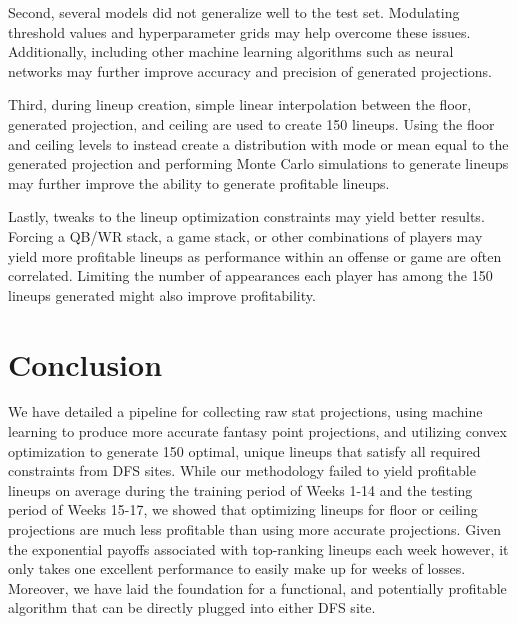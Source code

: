 \documentclass[12pt]{article}
\begin{document}
Second, several models did not generalize well to the test set. Modulating threshold values and hyperparameter grids may help overcome these issues. Additionally, including other machine learning algorithms such as neural networks may further improve accuracy and precision of generated projections.\bigskip

Third, during lineup creation, simple linear interpolation between the floor, generated projection, and ceiling are used to create 150 lineups. Using the floor and ceiling levels to instead create a distribution with mode or mean equal to the generated projection and performing Monte Carlo simulations to generate lineups may further improve the ability to generate profitable lineups. \bigskip

Lastly, tweaks to the lineup optimization constraints may yield better results. Forcing a QB/WR stack, a game stack, or other combinations of players may yield more profitable lineups as performance within an offense or game are often correlated. Limiting the number of appearances each player has among the 150 lineups generated might also improve profitability.

\section{Conclusion}
We have detailed a pipeline for collecting raw stat projections, using machine learning to produce more accurate fantasy point projections, and utilizing convex optimization to generate 150 optimal, unique lineups that satisfy all required constraints from DFS sites. While our methodology failed to yield profitable lineups on average during the training period of Weeks 1-14 and the testing period of Weeks 15-17, we showed that optimizing lineups for floor or ceiling projections are much less profitable than using more accurate projections. Given the exponential payoffs associated with top-ranking lineups each week however, it only takes one excellent performance to easily make up for weeks of losses. Moreover, we have laid the foundation for a functional, and potentially profitable algorithm that can be directly plugged into either DFS site.

\end{document}
